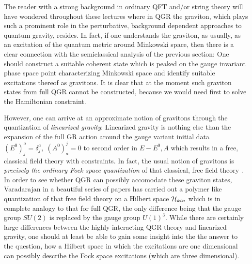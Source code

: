 \documentclass[12pt]{report}
\begin{document}
The reader with a strong background in ordinary QFT and/or string theory
will have wondered throughout these lectures where in QGR the graviton, 
which plays such a prominent role in the perturbative, background dependent
approaches to quantum gravity, resides. In fact, if one understands the 
graviton, as usually, as an excitation of the quantum metric around   
Minkowski space, then there is a clear connection with the semiclassical
analysis of the previous section: One should construct a suitable 
coherent state which is peaked on the gauge invariant 
phase space point characterizing Minkowski space and identify suitable
excitations thereof as gravitons. It is clear that at the moment 
such graviton states from full QGR cannot be constructed, because we would 
need first to solve the Hamiltonian constraint. 

However, one can arrive at
an approximate notion of gravitons through the quantization of {\it 
linearized gravity}: Linearized gravity is nothing else than the expansion 
of the full GR action around the gauge variant initial data 
$(E^0)^a_j=\delta^a_j,\;(A^0)_a^j=0$ to second order in $E-E^0,A$
which results in a free, classical field theory with constraints. In fact, 
the usual notion 
of gravitons is {\it precisely the ordinary Fock space quantization}
of that classical, free field theory \cite{68}. In order to see whether
QGR can possibly accomodate these graviton states, Varadarajan in a 
beautiful series of papers \cite{69} has carried out a polymer like 
quantization of that free field theory on a Hilbert space 
${\cal H}_{kin}$ which is in complete analogy to that for full QGR,
the only difference being that the gauge group $SU(2)$ is 
replaced by the gauge group $U(1)^3$. While there are certainly large 
differences between the highly interacting QGR theory and linearized 
gravity, one should at least be able to gain some insight into the 
the answer to the question, how a Hilbert space in which the 
excitations are one dimensional can possibly describe the Fock 
space excitations (which are three dimensional).
\end{document}
